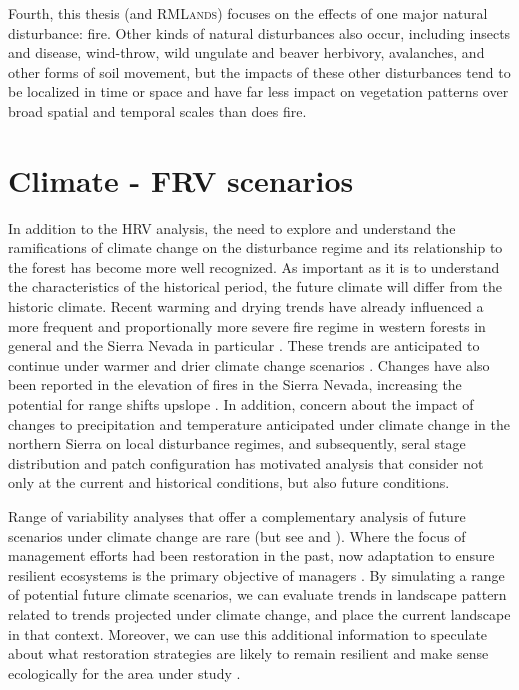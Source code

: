 Fourth, this thesis (and \textsc{RMLands}) focuses on the effects of one major natural disturbance: fire. Other kinds of natural disturbances also occur, including insects and disease, wind-throw, wild ungulate and beaver herbivory, avalanches, and other forms of soil movement, but the impacts of these other disturbances tend to be localized in time or space and have far less impact on vegetation patterns over broad spatial and temporal scales than does fire.

\section{Climate - FRV scenarios}

In addition to the HRV analysis, the need to explore and understand the ramifications of climate change on the disturbance regime and its relationship to the forest has become more well recognized. As important as it is to understand the characteristics of the historical period, the future climate will differ from the historic climate. 
%
Recent warming and drying trends have already influenced a more frequent and proportionally more severe fire regime in western forests in general and the Sierra Nevada in particular \citep{McKenzie2004,Westerling2011,Miller2012}. These trends are anticipated to continue under warmer and drier climate change scenarios \citep{Westerling2008}. Changes have also been reported in the elevation of fires in the Sierra Nevada, increasing the potential for range shifts upslope \citep{Schwartz2015}. In addition, concern about the impact of changes to precipitation and temperature anticipated under climate change in the northern Sierra on local disturbance regimes, and subsequently, seral stage distribution and patch configuration has motivated analysis that consider not only at the current and historical conditions, but also future conditions\citep{Fule2008,North2012}.

Range of variability analyses that offer a complementary analysis of future scenarios under climate change are rare (but see \cite{Keane2008} and \cite{Duveneck2014}). Where the focus of management efforts had been restoration in the past, now adaptation to ensure resilient ecosystems is the primary objective of managers \citep{Stephens2010}. By simulating a range of potential future climate scenarios, we can evaluate trends in landscape pattern related to trends projected under climate change, and place the current landscape in that context. Moreover, we can use this additional information to speculate about what restoration strategies are likely to remain resilient and make sense ecologically for the area under study \citep{Duncan2010}. 

